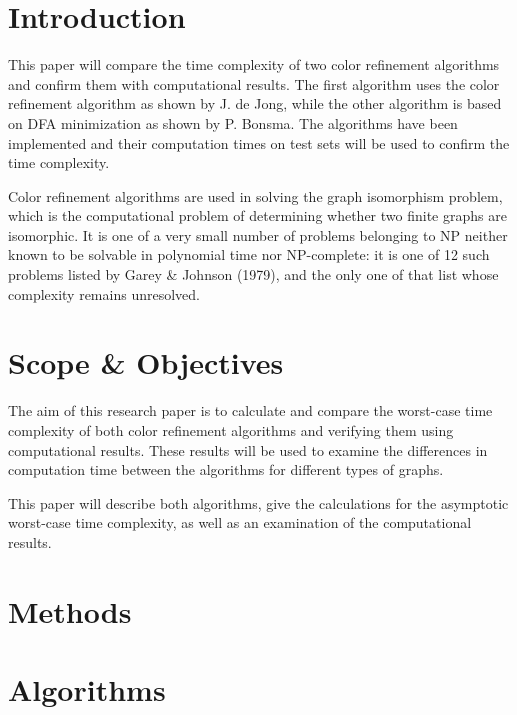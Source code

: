 \documentclass[twoside]{article}
\begin{document}
\begin{multicols}{2} %



\section{Introduction}
This paper will compare the time complexity of two color refinement algorithms and confirm them with computational results. The first algorithm uses the color refinement algorithm as shown by J. de Jong\cite{presentation:slidesPartI}, while the other algorithm is based on DFA minimization as shown by P. Bonsma\cite{presentation:slidesPartIII}. The algorithms have been implemented and their computation times on test sets will be used to confirm the time complexity.

Color refinement algorithms are used in solving the graph isomorphism problem, which is the computational problem of determining whether two finite graphs are isomorphic. It is one of a very small number of problems belonging to NP neither known to be solvable in polynomial time nor NP-complete: it is one of 12 such problems listed by Garey \& Johnson (1979)\cite{book:gareyJohnson1979}, and the only one of that list whose complexity remains unresolved.\cite{website:wikiGI}

\section{Scope \& Objectives}
The aim of this research paper is to calculate and compare the worst-case time complexity of both color refinement algorithms and verifying them using computational results. These results will be used to examine the differences in computation time between the algorithms for different types of graphs.

This paper will describe both algorithms, give the calculations for the asymptotic worst-case time complexity, as well as an examination of the computational results.
\section{Methods}

\section{Algorithms}


\end{multicols}
\end{document}
